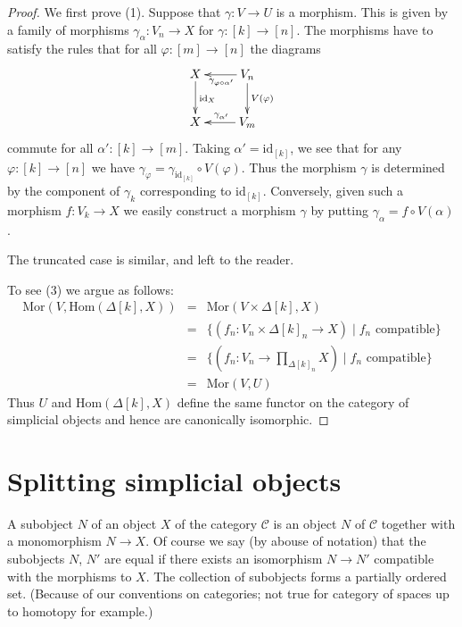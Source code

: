\begin{proof}
We first prove (1).
Suppose that $\gamma : V \to U$ is a morphism.
This is given by a family of morphisms
$\gamma_{\alpha} : V_n \to X$ for $\gamma : [k] \to [n]$.
The morphisms have to satisfy the
rules that for all $\varphi : [m] \to [n]$ the diagrams
$$
\xymatrix{
X \ar[d]^{\text{id}_X} &
V_n \ar[d]^{V(\varphi)}
\ar[l]^{\gamma_{\varphi \circ \alpha'}} \\
X &
V_m \ar[l]_{\gamma_{\alpha'}}
}
$$
commute for all $\alpha' : [k] \to [m]$.
Taking $\alpha' = \text{id}_{[k]}$, we see that
for any $\varphi : [k] \to [n]$ we have $\gamma_\varphi =
\gamma_{\text{id}_{[k]}} \circ V(\varphi)$. Thus the morphism
$\gamma$ is determined by the component of $\gamma_k$
corresponding to $\text{id}_{[k]}$. Conversely,
given such a morphism $f : V_k \to X$ we easily
construct a morphism $\gamma$ by putting
$\gamma_\alpha = f \circ V(\alpha)$.

\medskip\noindent
The truncated case is similar, and left to the reader.

\medskip\noindent
To see (3) we argue as follows:
\begin{eqnarray*}
\text{Mor}(V, \text{Hom}(\Delta[k], X)) & = &
\text{Mor}(V \times \Delta[k], X) \\
& = & \{ (f_n : V_n \times \Delta[k]_n \to X) \mid
f_n \text{ compatible}\} \\
& = & \{ (f_n : V_n \to \prod\nolimits_{\Delta[k]_n} X) \mid
f_n \text{ compatible}\} \\
& = & \text{Mor}(V, U)
\end{eqnarray*}
Thus $U$ and $\text{Hom}(\Delta[k], X)$ define the same
functor on the category of simplicial objects and
hence are canonically isomorphic.
\end{proof}

















\section{Splitting simplicial objects}
\label{section-splitting}

\noindent
A subobject $N$ of an object $X$ of the category $\mathcal{C}$
is an object $N$ of $\mathcal{C}$ together with a monomorphism
$N \to X$. Of course we say (by abouse of notation) that
the subobjects $N$, $N'$ are equal if there exists an isomorphism
$N \to N'$ compatible with the morphisms to $X$. The collection
of subobjects forms a partially ordered set. (Because of our
conventions on categories; not true for category of spaces
up to homotopy for example.)

